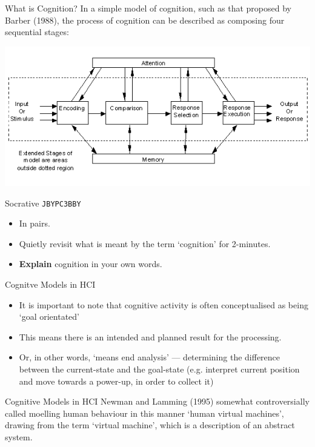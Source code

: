 \begin{frame}{What is Cognition?}
	In a simple model of cognition, such as that proposed by Barber (1988), the process of cognition can be described as composing four sequential
	stages: 
	
	\vspace{2ex}

	\includegraphics[height=24ex]{barber_cognition.png}
\end{frame}

\begin{frame}[fragile]{Socrative \texttt{JBYPC3BBY}}
	\begin{itemize}
		\item In pairs.
		\item Quietly revisit what is meant by the term `cognition' for 2-minutes.
		\item \textbf{Explain} cognition in your own words.
	\end{itemize}
\end{frame}

\begin{frame}{Cognitve Models in HCI}
	\begin{itemize}
		\item It is important to note that cognitive activity is often conceptualised as being `goal orientated'
		\item This means there is an intended and planned result for the processing.
		\item Or, in other words, `means end analysis' --- determining the difference between the current-state and the goal-state (e.g. interpret current position
		and move towards a power-up, in order to collect it)
	\end{itemize}
\end{frame}

\begin{frame}{Cognitive Models in HCI}
	Newman and Lamming (1995) somewhat controversially called moelling human behaviour in this manner `human virtual machines', drawing from the 
	term `virtual machine', which is a description of an abstract system. 
\end{frame}

